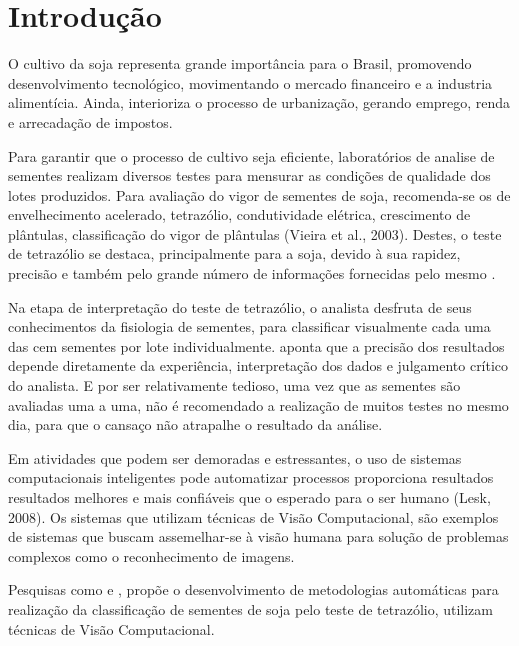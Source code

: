 

\begin{list}{label}{spacing}
	\item 
\end{list}


\chapter{Introdução} \label{ch:intro}

O cultivo da soja  representa grande importância para o Brasil, promovendo desenvolvimento tecnológico, movimentando o mercado financeiro e a industria alimentícia. Ainda, interioriza o processo de urbanização, gerando emprego, renda e arrecadação de impostos.

Para garantir que o processo de cultivo seja eficiente, laboratórios de analise de sementes realizam diversos testes para mensurar as condições de qualidade dos lotes produzidos. Para avaliação do vigor de sementes de soja, recomenda-se os de envelhecimento acelerado, tetrazólio, condutividade elétrica, crescimento de plântulas, classificação do vigor de plântulas (Vieira et al., 2003). Destes, o teste de tetrazólio se destaca, principalmente para a soja, devido à sua rapidez, precisão e também pelo grande número de informações fornecidas pelo mesmo \cite{FrancaNeto1998}.

Na etapa de interpretação do teste de tetrazólio, o analista desfruta de seus conhecimentos da fisiologia de sementes, para classificar visualmente cada uma das cem sementes por lote individualmente.  aponta que a precisão dos resultados depende diretamente da experiência, interpretação dos dados e julgamento crítico do analista. E por ser relativamente tedioso, uma vez que as sementes são avaliadas uma a uma, não é recomendado a realização de muitos testes no mesmo dia, para que o cansaço não atrapalhe o resultado da análise.

Em atividades que podem ser demoradas e estressantes, o uso de sistemas computacionais inteligentes pode automatizar processos proporciona resultados resultados melhores e mais confiáveis que o esperado para o ser humano (Lesk, 2008). Os sistemas que utilizam técnicas de Visão Computacional, são exemplos de sistemas que buscam assemelhar-se à visão humana para solução de problemas complexos como o reconhecimento de imagens.

Pesquisas como  e , propõe o desenvolvimento de metodologias automáticas para realização da classificação de sementes de soja pelo teste de tetrazólio, utilizam técnicas de Visão Computacional. 

